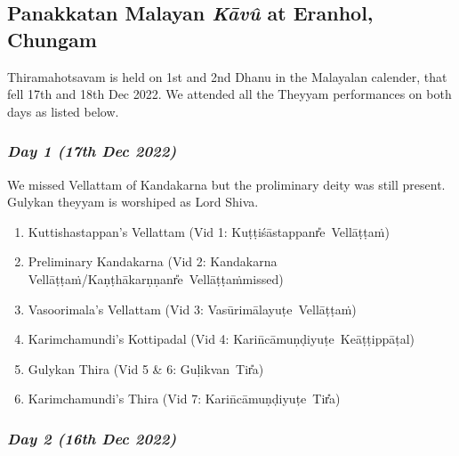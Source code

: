 \documentclass[a4paper, 11pt]{article} %
\newcommand{\kanthakarnnanre}[0]{Ka\d{n}\d{t}h\={a}kar\d{n}\d{n}an\U{r}e}
\newcommand{\kuttisastappanre}[0]{Ku\d{t}\d{t}i\'{s}\={a}stappan\U{r}e}
\newcommand{\vellattam}[0]{Vell\={a}\d{t}\d{t}a\.{m}}
\newcommand{\vasurimalavute}[0]{Vas\={u}rim\={a}layu\d{t}e}
\newcommand{\karincamundiyute}[0]{Kari\={n}c\={a}mu\d{n}\d{d}iyu\d{t}e}
\newcommand{\keattippatal}[0]{Ke\={a}\d{t}\d{t}ipp\={a}\d{t}al}
\newcommand{\gulikan}[0]{Gu\d{l}ikvan}
\newcommand{\tira}[0]{Ti\U{r}a}
\begin{document}
\subsection{Panakkatan Malayan \textit{K\={a}v\^{u}} at Eranhol, Chungam}%
  \label{sub:Panakkatan Malayan Kavu at Eranhol, Chungam}
  

Thiramahotsavam is held on 1st and 2nd Dhanu in the Malayalan calender, that fell 17th and 18th Dec 2022. 
We attended all the Theyyam performances on both days as listed below.

\subsubsection*{\em Day 1 (17th Dec 2022)}%
  \label{sub:Day 1 (17th Dec 2022)}
  
We missed Vellattam of Kandakarna but the proliminary deity was still present. 
Gulykan theyyam is worshiped as Lord Shiva.

\begin{enumerate}
\item Kuttishastappan's Vellattam (Vid 1: \kuttisastappanre\ \vellattam) 
\item Preliminary Kandakarna (Vid 2: Kandakarna \vellattam/\kanthakarnnanre\ \vellattam missed) 
\item Vasoorimala's Vellattam (Vid 3: \vasurimalavute\ \vellattam) 
\item Karimchamundi's Kottipadal (Vid 4: \karincamundiyute\ \keattippatal) 
\item Gulykan Thira (Vid 5 \& 6: \gulikan\ \tira) 
\item Karimchamundi's Thira (Vid 7: \karincamundiyute\ Ti\U{r}a) 
\end{enumerate}

\subsubsection*{\em Day 2 (16th Dec 2022)}%
  \label{sub:Day 2 (16th Dec 2022)}
\end{document}
